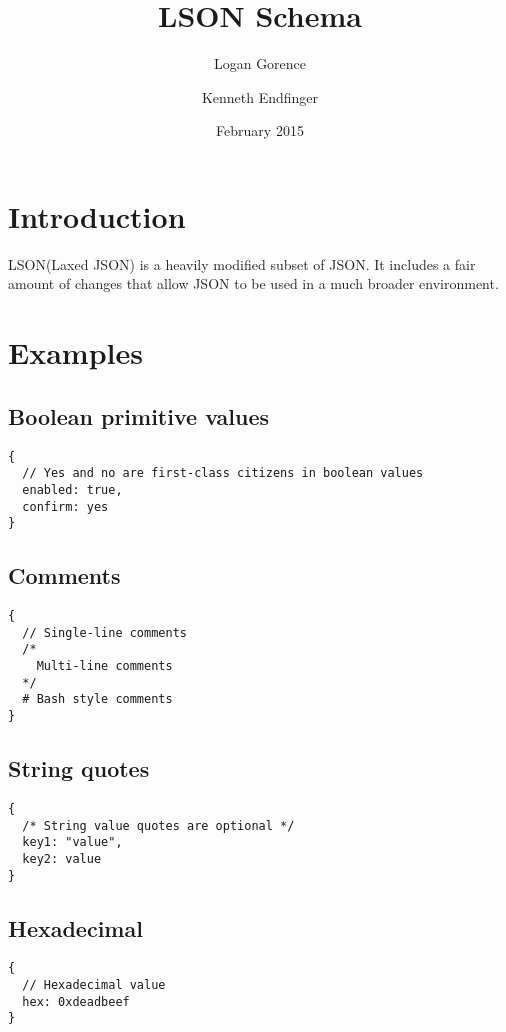 \documentclass[12pt]{article}
\begin{document}
\title{LSON Schema}
\author{Logan Gorence \and Kenneth Endfinger}
\date{February 2015}
\maketitle
{}
\newpage

\tableofcontents

\newpage

\section{Introduction}
LSON(Laxed JSON) is a heavily modified subset of JSON. It includes a fair amount of changes that allow JSON to be used in a much  broader environment.

\newpage

\section{Examples}
\subsection{Boolean primitive values}
\label{booleanPrimValueExample}
\begin{lstlisting}
{
  // Yes and no are first-class citizens in boolean values
  enabled: true,
  confirm: yes
}
\end{lstlisting}

\subsection{Comments}
\label{commentsExample}
\begin{lstlisting}
{
  // Single-line comments
  /*
    Multi-line comments
  */
  # Bash style comments
}
\end{lstlisting}

\subsection{String quotes}
\label{stringQuotesExample}
\begin{lstlisting}
{
  /* String value quotes are optional */
  key1: "value",
  key2: value
}
\end{lstlisting}

\subsection{Hexadecimal}
\label{hexExample}
\begin{lstlisting}
{
  // Hexadecimal value
  hex: 0xdeadbeef
}
\end{lstlisting}
\end{document}
